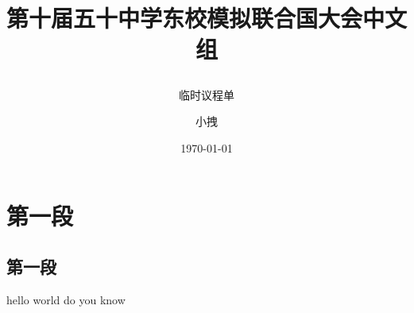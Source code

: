 \documentclass{article}
\title{第十届五十中学东校模拟联合国大会中文组 \\ \subtitle{临时议程单}}
\date{\today}
\author{小拽}
\begin{document}
\maketitle
\section{第一段}
\subsection{第一段}
hello world do you know
\end{document}
